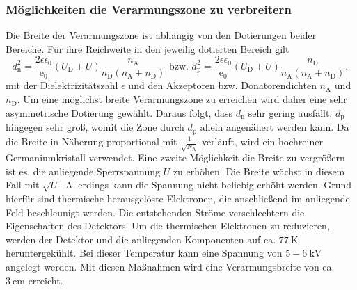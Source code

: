 \subsubsection{Möglichkeiten die Verarmungszone zu verbreitern}

Die Breite der Verarmungszone ist abhängig von den Dotierungen beider Bereiche. Für ihre Reichweite in den jeweilig dotierten Bereich gilt
\begin{equation}
    d_\text{n}^2 = \frac{2 \epsilon \epsilon_0}{\text{e}_0} (U_\text{D} + U) \frac{n_\text{A}}{n_\text{D}(n_\text{A}+n_\text{D})} \text{ bzw. } d_\text{p}^2 = \frac{2\epsilon \epsilon _0}{\text{e}_0} (U_\text{D} + U) \frac{n_\text{D}}{n_\text{A}(n_\text{A}+n_\text{D})} , \label{eq:d}
\end{equation}
mit der Dielektrizitätszahl $\epsilon$ und den Akzeptoren bzw. Donatorendichten $n_\text{A}$ und $n_\text{D}$.
 Um eine möglichst breite Verarmungszone zu erreichen wird daher eine sehr asymmetrische Dotierung gewählt. Daraus folgt, dass $d_\text{n}$ sehr gering ausfällt, $d_\text{p}$ hingegen sehr groß, womit die Zone durch $d_\text{p}$ allein angenähert werden kann. Da die Breite in Näherung proportional mit $\frac{1}{\sqrt{N_\text{A}}}$ verläuft, wird ein hochreiner Germaniumkristall verwendet. Eine zweite Möglichkeit die Breite zu vergrößern ist es, die anliegende Sperrspannung $U$ zu erhöhen. Die Breite wächst in diesem Fall mit $\sqrt{U}$. Allerdings kann die Spannung nicht beliebig erhöht werden. Grund hierfür sind thermische herausgelöste Elektronen, die anschließend im anliegende Feld beschleunigt werden. Die entstehenden Ströme verschlechtern die Eigenschaften des Detektors. Um die thermischen Elektronen zu reduzieren, werden der Detektor und die anliegenden Komponenten auf ca. $\SI{77}{\kelvin}$ heruntergekühlt. Bei dieser Temperatur kann eine Spannung von $5-\SI{6}{\kilo\volt}$ angelegt werden. Mit diesen Maßnahmen wird eine Verarmungsbreite von ca. $\SI{3}{\centi\meter}$ erreicht.
 
